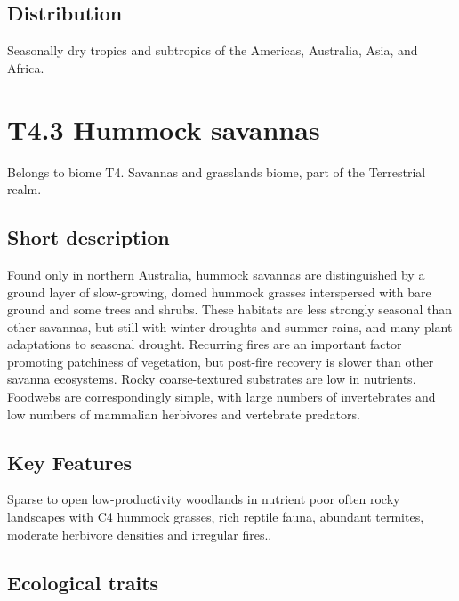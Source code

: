 \documentclass[
  letterpaper,
  DIV=11,
  numbers=noendperiod]{scrartcl}
\begin{document}
\subsection{Distribution}\label{distribution-84}

Seasonally dry tropics and subtropics of the Americas, Australia, Asia,
and Africa.

\section{T4.3 Hummock savannas}\label{t4.3-hummock-savannas}

Belongs to biome T4. Savannas and grasslands biome, part of the
Terrestrial realm.

\subsection{Short description}\label{short-description-85}

Found only in northern Australia, hummock savannas are distinguished by
a ground layer of slow-growing, domed hummock grasses interspersed with
bare ground and some trees and shrubs. These habitats are less strongly
seasonal than other savannas, but still with winter droughts and summer
rains, and many plant adaptations to seasonal drought. Recurring fires
are an important factor promoting patchiness of vegetation, but
post-fire recovery is slower than other savanna ecosystems. Rocky
coarse-textured substrates are low in nutrients. Foodwebs are
correspondingly simple, with large numbers of invertebrates and low
numbers of mammalian herbivores and vertebrate predators.

\subsection{Key Features}\label{key-features-85}

Sparse to open low-productivity woodlands in nutrient poor often rocky
landscapes with C4 hummock grasses, rich reptile fauna, abundant
termites, moderate herbivore densities and irregular fires..

\subsection{Ecological traits}\label{ecological-traits-85}
\end{document}
